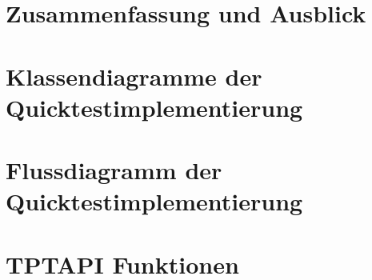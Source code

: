 		
	\chapter{Zusammenfassung und Ausblick}
		
		\label{LastPage}
		\setcounter{letzte}{\value{page}}
		
		
	
			
		
	\listoffigures
	\lstlistoflistings
	\appendix
		\chapter{Klassendiagramme der Quicktestimplementierung}
			
		\chapter{Flussdiagramm der Quicktestimplementierung}
			
		\chapter{TPTAPI Funktionen}
			

	\printbibliography


